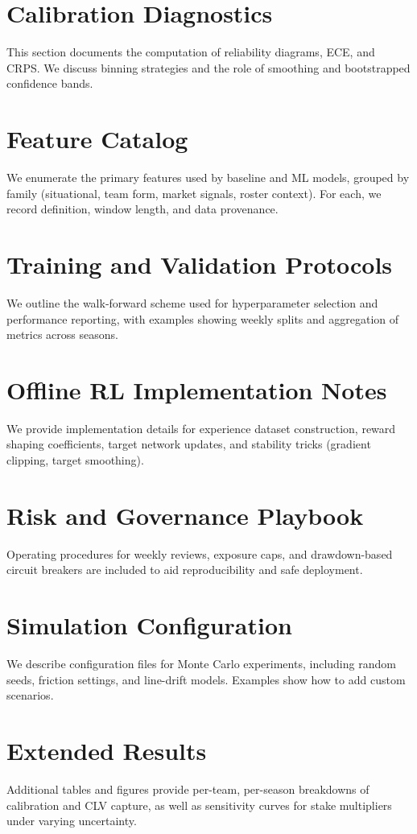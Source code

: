 \documentclass[12pt]{report}  %
\numberwithin{equation}{section}
\theoremstyle{plain}
\theoremstyle{definition}
\theoremstyle{remark}
\begin{document}
\section{Calibration Diagnostics}
This section documents the computation of reliability diagrams, ECE, and CRPS. We discuss binning strategies and the role of smoothing and bootstrapped confidence bands.

\section{Feature Catalog}
We enumerate the primary features used by baseline and ML models, grouped by family (situational, team form, market signals, roster context). For each, we record definition, window length, and data provenance.

\section{Training and Validation Protocols}
We outline the walk-forward scheme used for hyperparameter selection and performance reporting, with examples showing weekly splits and aggregation of metrics across seasons.

\section{Offline RL Implementation Notes}
We provide implementation details for experience dataset construction, reward shaping coefficients, target network updates, and stability tricks (gradient clipping, target smoothing).

\section{Risk and Governance Playbook}
Operating procedures for weekly reviews, exposure caps, and drawdown-based circuit breakers are included to aid reproducibility and safe deployment.

\section{Simulation Configuration}
We describe configuration files for Monte Carlo experiments, including random seeds, friction settings, and line-drift models. Examples show how to add custom scenarios.

\section{Extended Results}
Additional tables and figures provide per-team, per-season breakdowns of calibration and CLV capture, as well as sensitivity curves for stake multipliers under varying uncertainty.
\end{document}
